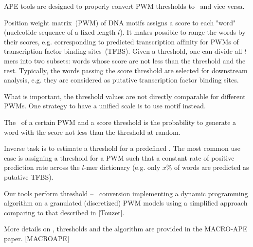 APE tools are designed to properly convert PWM thresholds to \pvalues\ and vice versa.

Position weight matrix~(PWM) of DNA motifs assigns a score to each "word" (nucleotide sequence of a fixed length $l$). It makes 
possible to range the words by their scores, e.g. corresponding to predicted transcription affinity for PWMs of transcription factor binding sites~(TFBS). Given a threshold, one can divide all $l$-mers into two subsets: words whose score are not less than the threshold and the rest. Typically, the words passing the score threshold are selected for downstream analysis, e.g. they are considered as putative transcription factor binding sites. 

What is important, the threshold values are not directly comparable for different PWMs. One strategy to have a unified scale is to use motif \pvalues instead.

The \pvalue\ of a certain PWM and a score threshold is the probability to generate a word with the score not less than the threshold at random.

Inverse task is to estimate a threshold for a predefined \pvalue. The most common use case is assigning a threshold for a PWM such that a constant rate of positive prediction rate across the $l$-mer dictionary (e.g. only $x\%$ of words are predicted as putative TFBS).

Our tools perform threshold -- \pvalue\ conversion implementing a dynamic programming algorithm on a granulated (discretized) PWM models using a simplified approach comparing to that described in [Touzet].

More details on \pvalues, thresholds and the algorithm are provided in the MACRO-APE paper. [MACROAPE] 
